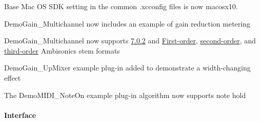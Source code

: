 \begin{DoxyItemize}
\item Base Mac O\+S S\+D\+K setting in the common .xcconfig files is now macosx10.  
\item Demo\+Gain\+\_\+\+Multichannel now includes an example of gain reduction metering  
\item Demo\+Gain\+\_\+\+Multichannel now supports \hyperlink{a00206_ad8af5ef008b2bd478add9a0acb0a1d85ad4d60796473e660c7bc2804cdc93c587}{7.0.2} and \hyperlink{a00206_ad8af5ef008b2bd478add9a0acb0a1d85a398f50508a237917d9c81be645ca4b90}{First-\/order}, \hyperlink{a00206_ad8af5ef008b2bd478add9a0acb0a1d85af6461ee858e0f121f7a070142f047dbb}{second-\/order}, and \hyperlink{a00206_ad8af5ef008b2bd478add9a0acb0a1d85a111ef1882171d9eea1b1b436e037fb47}{third-\/order} Ambisonics stem formats  
\item Demo\+Gain\+\_\+\+Up\+Mixer example plug-\/in added to demonstrate a width-\/changing effect  
\item The Demo\+M\+I\+D\+I\+\_\+\+Note\+On example plug-\/in algorithm now supports note hold  
\end{DoxyItemize}\hypertarget{a00375_aax_sdk_2p3p0_Interface}{}\paragraph{Interface}\label{a00375_aax_sdk_2p3p0_Interface}

